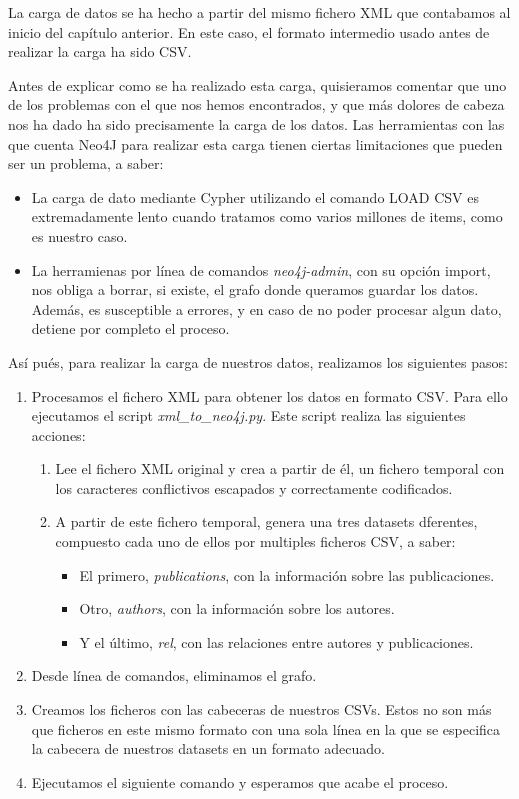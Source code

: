 La carga de datos se ha hecho a partir del mismo fichero \gls{XML} que contabamos al inicio del capítulo anterior. En este caso, el formato intermedio usado antes de realizar la carga ha sido \gls{CSV}. 

Antes de explicar como se ha realizado esta carga, quisieramos comentar que uno de los problemas con el que nos hemos encontrados, y que más dolores de cabeza nos ha dado ha sido precisamente la carga de los datos. Las herramientas con las que cuenta Neo4J para realizar esta carga tienen ciertas limitaciones que pueden ser un problema, a saber:

\begin{itemize}
 \item La carga de dato mediante Cypher utilizando el comando \gls{LOAD CSV} es extremadamente lento cuando tratamos como varios millones de items, como es nuestro caso.
 \item La herramienas por línea de comandos \textit{neo4j-admin}, con su opción \gls{import}, nos obliga a borrar, si existe, el grafo donde queramos guardar los datos. Además, es susceptible a errores, y en caso de no poder procesar algun dato, detiene por completo el proceso.
\end{itemize}

Así pués, para realizar la carga de nuestros datos, realizamos los siguientes pasos:

\begin{enumerate}
 \item Procesamos el fichero \gls{XML} para obtener los datos en formato \gls{CSV}. Para ello ejecutamos el script \textit{xml_to_neo4j.py}. Este script realiza las siguientes acciones:
 \begin{enumerate}
  \item Lee el fichero \gls{XML} original y crea a partir de él, un fichero temporal con los caracteres conflictivos escapados y correctamente codificados.
  \item A partir de este fichero temporal, genera una tres \gls{datasets} dferentes, compuesto cada uno de ellos por multiples ficheros \gls{CSV}, a saber:
  \begin{itemize}
   \item El primero, \textit{publications}, con la información sobre las publicaciones.
   \item Otro, \textit{authors}, con la información sobre los autores.
   \item Y el último, \textit{rel}, con las relaciones entre autores y publicaciones.
  \end{itemize}
 \end{enumerate}
 \item Desde línea de comandos, eliminamos el grafo.
 \item Creamos los ficheros con las cabeceras de nuestros \gls{CSVs}. Estos no son más que ficheros en este mismo formato con una sola línea en la que se especifica la cabecera de nuestros datasets en un formato adecuado.
 \item Ejecutamos el siguiente comando y esperamos que acabe el proceso.
\end{enumerate}





